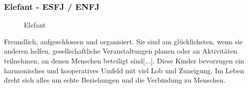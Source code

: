 \subsubsection{Elefant - ESFJ / ENFJ}
\begin{figure}[H]
	\centering
	\caption[Elefant]{Elefant \cite{knowAndLove}}
	\label{img:Elefant}
\end{figure}
\glqq Freundlich, aufgeschlossen und organisiert. Sie sind am glücklichsten, wenn sie anderen helfen, gesellschaftliche Veranstaltungen planen oder an Aktivitäten teilnehmen, an denen Menschen beteiligt sind[...]. Diese Kinder bevorzugen ein harmonisches und kooperatives Umfeld mit viel Lob und Zuneigung. Im Leben dreht sich alles um echte Beziehungen und die Verbindung zu Menschen. \grqq \cite{knowAndLove}
